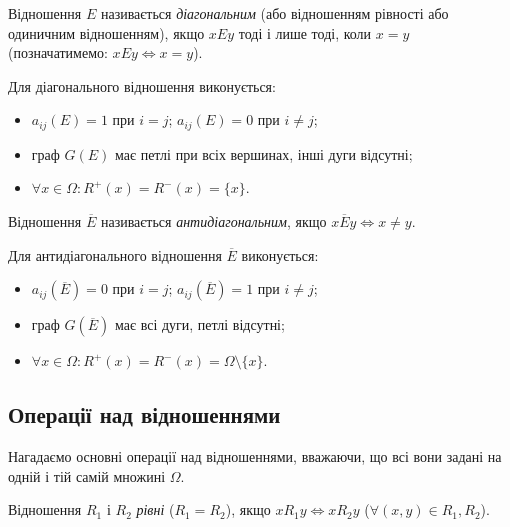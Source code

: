 \begin{definition}
	Відношення $E$ називається \textit{діагональним} (або відношенням рівності або одиничним відношенням), якщо $x E y$ тоді і лише тоді, коли $x = y$ (позначатимемо: $x E y \iff x = y$).
\end{definition}

\begin{properties}
	Для діагонального відношення виконується:
	\begin{itemize}
		\item $a_{ij}(E) = 1$ при $i = j$; $a_{ij}(E) = 0$ при $i \ne j$;
		\item граф $G(E)$ має петлі при всіх вершинах, інші дуги відсутні;
		\item $\forall x \in \Omega: R^+(x) = R^-(x) = \{x\}$.
	\end{itemize}
\end{properties}

\begin{definition}
	Відношення $\overline{E}$ називається \textit{антидіагональним}, якщо $x \overline{E} y \iff x \ne y$. 
\end{definition}

\begin{properties}
	Для антидіагонального відношення $\overline{E}$ виконується:
	\begin{itemize}
		\item $a_{ij}(\overline{E}) = 0$ при $i = j$; $a_{ij}(\overline{E}) = 1$ при $i \ne j$;
		\item граф $G(\overline{E})$ має всі дуги, петлі відсутні;
		\item $\forall x \in \Omega: R^+(x) = R^-(x) = \Omega \setminus \{x\}$.
	\end{itemize}
\end{properties}

\subsection{Операції над відношеннями}

Нагадаємо основні операції над відношеннями, вважаючи, що всі вони задані на одній і тій самій множині $\Omega$.

\begin{definition}
	Відношення $R_1$ і $R_2$ \textit{рівні} ($R_1 = R_2$), якщо $x R_1 y \iff x R_2 y$ ($\forall (x, y) \in R_1, R_2$).
\end{definition}

